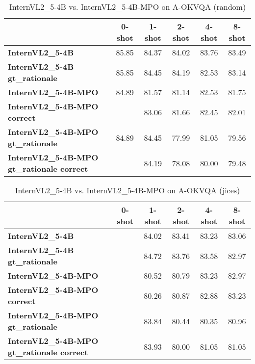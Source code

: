 \begin{table}
\caption{InternVL2\_5-4B vs. InternVL2\_5-4B-MPO on A-OKVQA (random)}
\label{tab:InternVL2_5-4B_A-OKVQA_TRAIN_random}
\begin{tabular}{lccccc}
\toprule
 & 0-shot & 1-shot & 2-shot & 4-shot & 8-shot \\
\midrule
\textbf{InternVL2\_5-4B} & 85.85 & 84.37 & 84.02 & 83.76 & 83.49 \\
\textbf{InternVL2\_5-4B gt\_rationale} & 85.85 & 84.45 & 84.19 & 82.53 & 83.14 \\
\textbf{InternVL2\_5-4B-MPO} & 84.89 & 81.57 & 81.14 & 82.53 & 81.75 \\
\textbf{InternVL2\_5-4B-MPO correct} &  & 83.06 & 81.66 & 82.45 & 82.01 \\
\textbf{InternVL2\_5-4B-MPO gt\_rationale} & 84.89 & 84.45 & 77.99 & 81.05 & 79.56 \\
\textbf{InternVL2\_5-4B-MPO gt\_rationale correct} &  & 84.19 & 78.08 & 80.00 & 79.48 \\
\bottomrule
\end{tabular}
\end{table}


\begin{table}
\caption{InternVL2\_5-4B vs. InternVL2\_5-4B-MPO on A-OKVQA (jices)}
\label{tab:InternVL2_5-4B_A-OKVQA_TRAIN_jices}
\begin{tabular}{lccccc}
\toprule
 & 0-shot & 1-shot & 2-shot & 4-shot & 8-shot \\
\midrule
\textbf{InternVL2\_5-4B} &  & 84.02 & 83.41 & 83.23 & 83.06 \\
\textbf{InternVL2\_5-4B gt\_rationale} &  & 84.72 & 83.76 & 83.58 & 82.97 \\
\textbf{InternVL2\_5-4B-MPO} &  & 80.52 & 80.79 & 83.23 & 82.97 \\
\textbf{InternVL2\_5-4B-MPO correct} &  & 80.26 & 80.87 & 82.88 & 83.23 \\
\textbf{InternVL2\_5-4B-MPO gt\_rationale} &  & 83.84 & 80.44 & 80.35 & 80.96 \\
\textbf{InternVL2\_5-4B-MPO gt\_rationale correct} &  & 83.93 & 80.00 & 81.05 & 81.05 \\
\bottomrule
\end{tabular}
\end{table}


